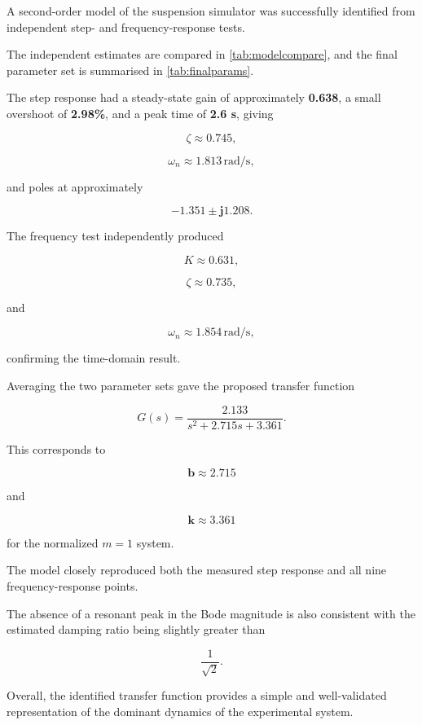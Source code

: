 \documentclass[12pt,a4paper]{article}
\begin{document}
A second-order model of the suspension simulator was successfully
identified from independent step- and frequency-response tests.

The independent estimates are compared in
\cref{tab:modelcompare}, and the final parameter set is summarised
in \cref{tab:finalparams}.

The step response had a steady-state gain of approximately
\textbf{0.638}, a small overshoot of \textbf{2.98\%}, and a peak
time of \textbf{2.6 s}, giving

\[
\zeta\approx\mathbf{0.745},
\]

\[
\omega_n
\approx
\mathbf{1.813}\,\mathrm{rad/s},
\]

and poles at approximately

\[
\mathbf{-1.351\pm j1.208}.
\]

The frequency test independently produced

\[
K\approx\mathbf{0.631},
\]

\[
\zeta\approx\mathbf{0.735},
\]

and

\[
\omega_n
\approx
\mathbf{1.854}\,\mathrm{rad/s},
\]

confirming the time-domain result.

Averaging the two parameter sets gave the proposed transfer
function

\[
\boxed{
G(s)
=
\frac{2.133}
{s^2+2.715s+3.361}
}.
\]

This corresponds to

\[
\boldsymbol{b\approx2.715}
\]

and

\[
\boldsymbol{k\approx3.361}
\]

for the normalized $m=1$ system.

The model closely reproduced both the measured step response and
all nine frequency-response points.

The absence of a resonant peak in the Bode magnitude is also
consistent with the estimated damping ratio being slightly greater
than

\[
\frac{1}{\sqrt{2}}.
\]

Overall, the identified transfer function provides a simple and
well-validated representation of the dominant dynamics of the
experimental system.

\newpage

\end{document}
